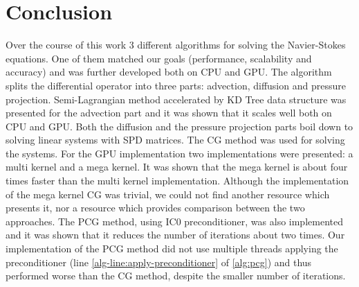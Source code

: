 \chapter*{Conclusion} 
Over the course of this work 3 different algorithms for solving the Navier-Stokes equations. One of them matched our goals (performance, scalability and accuracy) and was further developed both on CPU and GPU. The algorithm splits the differential operator into three parts: advection, diffusion and pressure projection. Semi-Lagrangian method accelerated by KD Tree data structure was presented for the advection part and it was shown that it scales well both on CPU and GPU. Both the diffusion and the pressure projection parts boil down to solving linear systems with SPD matrices. The CG method was used for solving the systems. For the GPU implementation two implementations were presented: a multi kernel and a mega kernel. It was shown that the mega kernel is about four times faster than the multi kernel implementation. Although the implementation of the mega kernel CG was  trivial, we could not find another resource which presents it, nor a resource which provides comparison between the two approaches. The PCG method, using IC0 preconditioner, was also implemented and it was shown that it reduces the number of iterations about two times. Our implementation of the PCG method did not use multiple threads applying the preconditioner (line \ref{alg-line:apply-preconditioner} of \cref{alg:pcg}) and thus performed worse than the CG method, despite the smaller number of iterations.